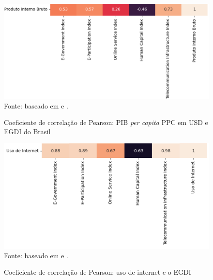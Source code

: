 \begin{figure}[H]
    \centering
    \caption{Coeficiente de correlação de Pearson: PIB \textit{per capita} PPC em USD e EGDI do Brasil}
    \includegraphics[width=1\linewidth]{figuras/egdi/correlacao6.png}
    \label{fig:correlacao6}
    \footnotesize{Fonte: baseado em \cite{ONU_edgi_mapa} e \cite{WB_pib_per_capita_paises}.}
\end{figure}

\begin{figure}[H]
    \centering
    \caption{Coeficiente de correlação de Pearson: uso de internet e o EGDI}
    \includegraphics[width=1\linewidth]{figuras/egdi/correlacao7.png}
    \label{fig:correlacao7.}
    \footnotesize{Fonte: baseado em \cite{ONU_edgi_mapa} e \cite{ITU_uso_internet_mundo}.}
\end{figure}